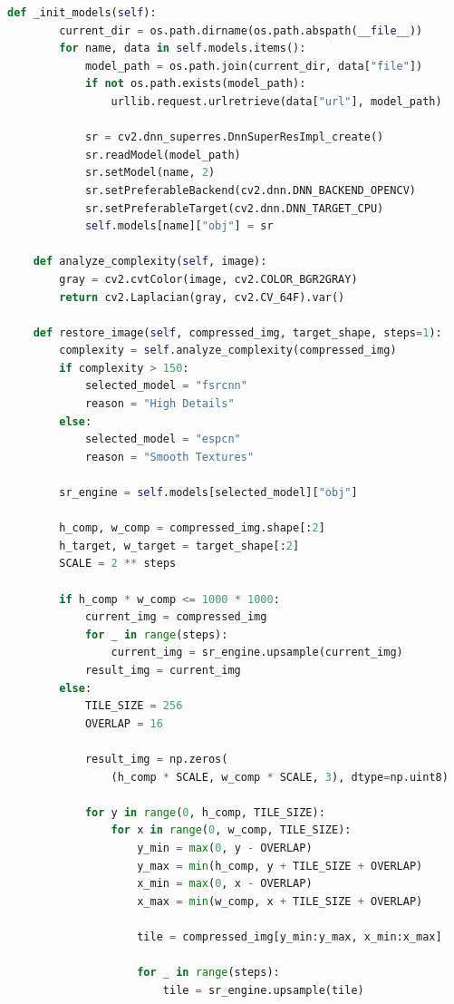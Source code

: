\begin{lstlisting}[language=Python, style=CodeListing, breaklines=true, showstringspaces=false]
    def _init_models(self):
        current_dir = os.path.dirname(os.path.abspath(__file__))
        for name, data in self.models.items():
            model_path = os.path.join(current_dir, data["file"])
            if not os.path.exists(model_path):
                urllib.request.urlretrieve(data["url"], model_path)

            sr = cv2.dnn_superres.DnnSuperResImpl_create()
            sr.readModel(model_path)
            sr.setModel(name, 2)
            sr.setPreferableBackend(cv2.dnn.DNN_BACKEND_OPENCV)
            sr.setPreferableTarget(cv2.dnn.DNN_TARGET_CPU)
            self.models[name]["obj"] = sr

    def analyze_complexity(self, image):
        gray = cv2.cvtColor(image, cv2.COLOR_BGR2GRAY)
        return cv2.Laplacian(gray, cv2.CV_64F).var()

    def restore_image(self, compressed_img, target_shape, steps=1):
        complexity = self.analyze_complexity(compressed_img)
        if complexity > 150:
            selected_model = "fsrcnn"
            reason = "High Details"
        else:
            selected_model = "espcn"
            reason = "Smooth Textures"

        sr_engine = self.models[selected_model]["obj"]

        h_comp, w_comp = compressed_img.shape[:2]
        h_target, w_target = target_shape[:2]
        SCALE = 2 ** steps

        if h_comp * w_comp <= 1000 * 1000:
            current_img = compressed_img
            for _ in range(steps):
                current_img = sr_engine.upsample(current_img)
            result_img = current_img
        else:
            TILE_SIZE = 256
            OVERLAP = 16

            result_img = np.zeros(
                (h_comp * SCALE, w_comp * SCALE, 3), dtype=np.uint8)

            for y in range(0, h_comp, TILE_SIZE):
                for x in range(0, w_comp, TILE_SIZE):
                    y_min = max(0, y - OVERLAP)
                    y_max = min(h_comp, y + TILE_SIZE + OVERLAP)
                    x_min = max(0, x - OVERLAP)
                    x_max = min(w_comp, x + TILE_SIZE + OVERLAP)

                    tile = compressed_img[y_min:y_max, x_min:x_max]

                    for _ in range(steps):
                        tile = sr_engine.upsample(tile)


\end{lstlisting}
